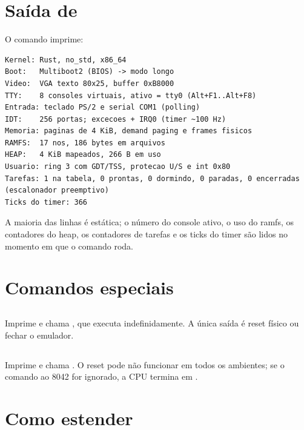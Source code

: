 \section{Sa\'ida de }

O comando  imprime:

\begin{lstlisting}[style=shell,caption={Sa\'ida do comando \code{info}.},label={lst:info}]
Kernel: Rust, no_std, x86_64
Boot:   Multiboot2 (BIOS) -> modo longo
Video:  VGA texto 80x25, buffer 0xB8000
TTY:    8 consoles virtuais, ativo = tty0 (Alt+F1..Alt+F8)
Entrada: teclado PS/2 e serial COM1 (polling)
IDT:    256 portas; excecoes + IRQ0 (timer ~100 Hz)
Memoria: paginas de 4 KiB, demand paging e frames fisicos
RAMFS:  17 nos, 186 bytes em arquivos
HEAP:   4 KiB mapeados, 266 B em uso
Usuario: ring 3 com GDT/TSS, protecao U/S e int 0x80
Tarefas: 1 na tabela, 0 prontas, 0 dormindo, 0 paradas, 0 encerradas (escalonador preemptivo)
Ticks do timer: 366
\end{lstlisting}

A maioria das linhas \'e est\'atica; o n\'umero do console ativo, o uso do
ramfs, os contadores do heap, os contadores de tarefas e os ticks do timer
s\~ao lidos no momento em que o comando roda.

\section{Comandos especiais}

\subsection{}

Imprime  e chama
, que executa  indefinidamente. A
\'unica sa\'ida \'e reset f\'isico ou fechar o emulador.

\subsection{}

Imprime  e chama . O reset pode
n\~ao funcionar em todos os ambientes; se o comando ao 8042 for ignorado, a
CPU termina em .

\section{Como estender}

